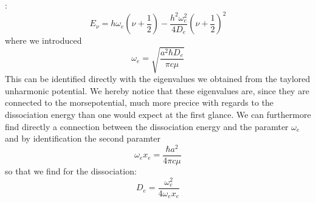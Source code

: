 \cite{fliessbach2008quantenmechanik}:
\begin{equation}
    E_\nu = h \omega_{e} \left( \nu + \frac{1}{2}
        \right) - \frac{h^2 \omega_{e}^2}{4 D_e} 
    \left( \nu + \frac{1}{2} \right)^2
\end{equation}
where we introduced
\begin{equation}
    \omega_{e} = \sqrt{\frac{a^2 \hbar D_e}{\pi c \mu}}
\end{equation}
This can be identified directly with the eigenvalues we obtained
from the taylored unharmonic potential. We hereby notice that these
eigenvalues are, since they are connected to the morsepotential,
much more precice with regards to the dissociation energy than
one would expect at the first glance. We can furthermore
find directly a connection between the dissociation energy and 
the paramter $\omega_e$ and by identification the second
paramter
\begin{equation}
    \omega_e x_e = \frac{\hbar a^2}{4\pi c \mu}
\end{equation}
so that we find for the dissociation:
\begin{equation}
    D_e = \frac{\omega_e^2}{4 \omega_e x_e}
\end{equation}
\clearpage
